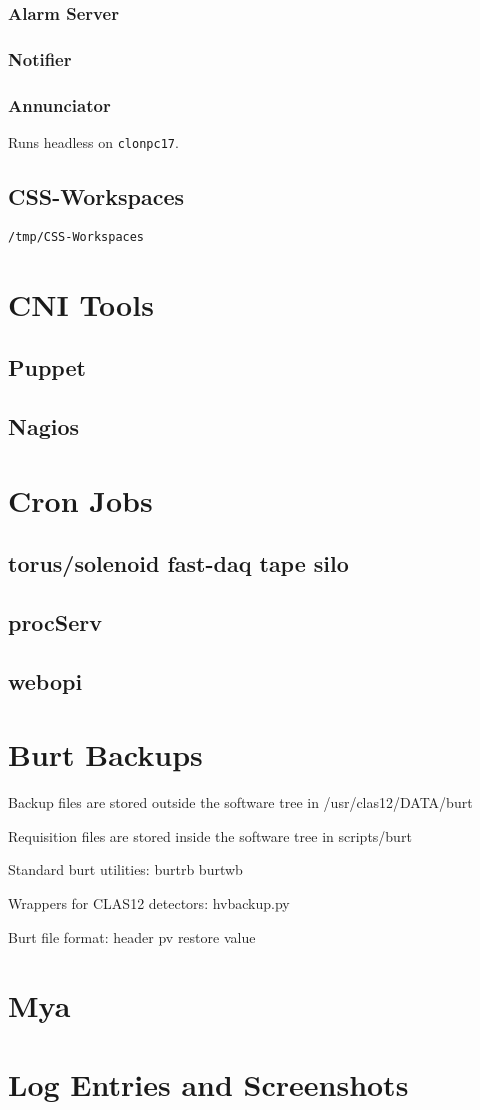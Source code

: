 \documentclass[amsmath,amssymb,notitlepage,11pt]{revtex4}
\begin{document}
\subsubsection{Alarm Server}
\subsubsection{Notifier}
\subsubsection{Annunciator}
Runs headless on \texttt{clonpc17}.

\subsection{CSS-Workspaces}
\texttt{/tmp/CSS-Workspaces}

\section{CNI Tools}
\subsection{Puppet}
\subsection{Nagios}

\section{Cron Jobs}
\subsection{torus/solenoid fast-daq tape silo}
\subsection{procServ}
\subsection{webopi}

\section{Burt Backups}
Backup files are stored outside the software tree in
/usr/clas12/DATA/burt

Requisition files are stored inside the software tree in
scripts/burt

Standard burt utilities:
burtrb
burtwb

Wrappers for CLAS12 detectors:
hvbackup.py

Burt file format:
header
pv restore value

\section{Mya}

\section{Log Entries and Screenshots}


%
\end{document}

